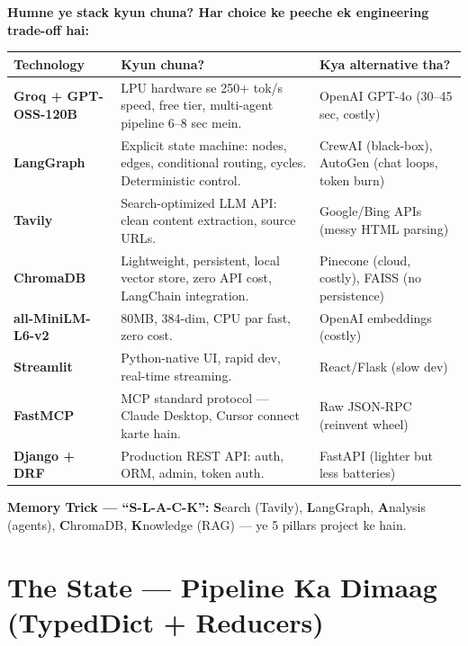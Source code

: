 \documentclass[11pt, a4paper]{article}
\begin{document}
\begin{designbox}
\textbf{Humne ye stack kyun chuna? Har choice ke peeche ek engineering trade-off hai:}

\begin{longtable}{p{3.2cm} p{4.5cm} p{5.5cm}}
\toprule
\textbf{Technology} & \textbf{Kyun chuna?} & \textbf{Kya alternative tha?} \\
\midrule
\textbf{Groq + GPT-OSS-120B} & LPU hardware se 250+ tok/s speed, free tier, multi-agent pipeline 6--8 sec mein. & OpenAI GPT-4o (30--45 sec, costly) \\
\textbf{LangGraph} & Explicit state machine: nodes, edges, conditional routing, cycles. Deterministic control. & CrewAI (black-box), AutoGen (chat loops, token burn) \\
\textbf{Tavily} & Search-optimized LLM API: clean content extraction, source URLs. & Google/Bing APIs (messy HTML parsing) \\
\textbf{ChromaDB} & Lightweight, persistent, local vector store, zero API cost, LangChain integration. & Pinecone (cloud, costly), FAISS (no persistence) \\
\textbf{all-MiniLM-L6-v2} & 80MB, 384-dim, CPU par fast, zero cost. & OpenAI embeddings (costly) \\
\textbf{Streamlit} & Python-native UI, rapid dev, real-time streaming. & React/Flask (slow dev) \\
\textbf{FastMCP} & MCP standard protocol --- Claude Desktop, Cursor connect karte hain. & Raw JSON-RPC (reinvent wheel) \\
\textbf{Django + DRF} & Production REST API: auth, ORM, admin, token auth. & FastAPI (lighter but less batteries) \\
\bottomrule
\end{longtable}
\end{designbox}

\begin{memorybox}
\textbf{Memory Trick --- ``S-L-A-C-K'':}
\textbf{S}earch (Tavily), \textbf{L}angGraph, \textbf{A}nalysis (agents), \textbf{C}hromaDB, \textbf{K}nowledge (RAG) --- ye 5 pillars project ke hain.
\end{memorybox}

\section{The State --- Pipeline Ka Dimaag (TypedDict + Reducers)}
\end{document}
